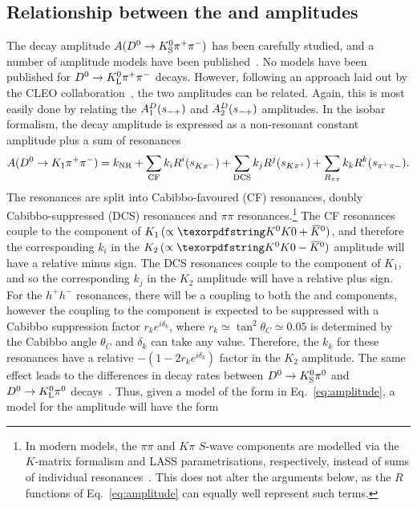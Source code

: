 \subsection{\texorpdfstring{Relationship between the \KS and \KL amplitudes}{Relationship between the KS and KL amplitudes}} %
\label{sub:relationship_between_the_ks_and_kl_amplitudes}


The decay amplitude $A({{D}^0}\rightarrow{\ensuremath{{K}^0_{\mathrm{S}}}}\pi^+\pi^-)$ has been carefully studied, and a number of amplitude models have been published~\cite{BABAR2005,BABAR2008,BABAR2010,BELLE2010,Belle2018}. No models have been published for ${{D}^0}\rightarrow{\ensuremath{{K}^0_{\mathrm{L}}}} \pi^+\pi^-$  decays. However, following an approach laid out by the CLEO collaboration~\cite{CLEOCISI}, the two amplitudes can be related. Again, this is most easily done by relating the  $A^{D}_1(s_{-+})$ and $A^{D}_2(s_{-+})$ amplitudes. In the isobar formalism, the decay amplitude  is expressed as a non-resonant constant amplitude plus a sum of resonances
\begin{align}\label{eq:amplitude}
    A({{D}^0}\rightarrow K_1 \pi^+\pi^-) = k_\mathrm{NR} + \sum_\mathrm{CF} k_i R^i(s_{K\pi^-}) + \sum_\mathrm{DCS} k_j R^j(s_{K\pi^+}) + \sum_{R_{\pi\pi}} k_k R^k(s_{\pi^+\pi-}).
\end{align}
The resonances are split into Cabibbo-favoured (CF) \Kstarm resonances, doubly Cabibbo-suppressed (DCS) \Kstarp resonances and $\pi\pi$ resonances.\footnote{In modern models, the $\pi\pi$ and $K\pi$ $S$-wave components are modelled via the $K$-matrix formalism and LASS parametrisations, respectively, instead of sums of individual resonances~\cite{Belle2018}. This does not alter the arguments below, as the $R$ functions of Eq.~\eqref{eq:amplitude} can equally well represent such terms.} The CF resonances couple to the \Kzb component of $K_1\,(\propto \Kz+\Kzb)$, and therefore the corresponding $k_i$ in the $K_2\,(\propto \Kz-\Kzb)$ amplitude will have a relative minus sign. The DCS resonances couple to the \Kz component of $K_1$, and so the corresponding $k_j$ in the $K_2$ amplitude will have a relative plus sign. For the $h^+h^-$ resonances, there will be a coupling to both the \Kz and \Kzb components, however the coupling to the \Kz component is expected to be suppressed with a Cabibbo suppression factor $r_ke^{i\delta_k}$, where $r_k\simeq\tan^2\theta_C \simeq 0.05$ is determined by the Cabibbo angle $\theta_C$ and $\delta_k$ can take any value.  Therefore, the $k_k$ for these resonances have a relative $-(1-2r_ke^{i\delta_k})$ factor in the $K_2$ amplitude. The same effect leads to the differences in decay rates between ${{D}^0}\rightarrow{\ensuremath{{K}^0_{\mathrm{S}}}}{\ensuremath{{\pi}^0}}$ and ${{D}^0}\rightarrow{\ensuremath{{K}^0_{\mathrm{L}}}}{\ensuremath{{\pi}^0}}$ decays~\cite{bigiInterferenceCabibboAllowed1995,cleocollaborationComparisonEnsuremathRightarrowK2008}. Thus, given a model of the form in Eq.~\eqref{eq:amplitude}, a model for the  amplitude will have the form
